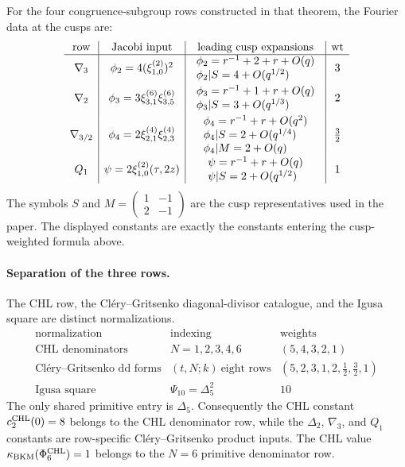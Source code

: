 For the four congruence-subgroup rows constructed in that theorem, the
Fourier data at the cusps are:
\[
\begin{array}{c|c|c|c}
\text{row} & \text{Jacobi input} & \text{leading cusp expansions}
& \operatorname{wt}\\
\hline
\nabla_3 &
\phi_2=4(\xi_{1,0}^{(2)})^2 &
\begin{array}{l}
\phi_2=r^{-1}+2+r+O(q)\\
\phi_2|S=4+O(q^{1/2})
\end{array}
& 3\\[2ex]
\nabla_2 &
\phi_3=3\xi_{3,1}^{(6)}\xi_{3,5}^{(6)} &
\begin{array}{l}
\phi_3=r^{-1}+1+r+O(q)\\
\phi_3|S=3+O(q^{1/3})
\end{array}
& 2\\[2ex]
\nabla_{3/2} &
\phi_4=2\xi_{2,1}^{(4)}\xi_{2,3}^{(4)} &
\begin{array}{l}
\phi_4=r^{-1}+r+O(q^2)\\
\phi_4|S=2+O(q^{1/4})\\
\phi_4|M=2+O(q)
\end{array}
& \frac32\\[3ex]
Q_1 &
\psi=2\xi_{1,0}^{(2)}(\tau,2z) &
\begin{array}{l}
\psi=r^{-1}+r+O(q)\\
\psi|S=2+O(q^{1/2})
\end{array}
& 1
\end{array}
\]
The symbols \(S\) and \(M=\left(\begin{smallmatrix}1&-1\\2&-1\end{smallmatrix}\right)\)
are the cusp representatives used in the paper.  The displayed constants
are exactly the constants entering the cusp-weighted formula above.

\paragraph{Separation of the three rows.}
The CHL row, the Cl\'ery--Gritsenko diagonal-divisor catalogue, and the
Igusa square are distinct normalizations.
\[
\begin{array}{c|c|c}
\text{normalization} & \text{indexing} & \text{weights}\\
\hline
\text{CHL denominators} & N=1,2,3,4,6 & (5,4,3,2,1)\\
\text{Cl\'ery--Gritsenko dd forms} & (t,N;k)\ \text{eight rows}
& (5,2,3,1,2,\frac12,\frac32,1)\\
\text{Igusa square} & \Psi_{10}=\Delta_5^2 & 10
\end{array}
\]
The only shared primitive entry is \(\Delta_5\).  Consequently the CHL
constant \(c_2^{\mathrm{CHL}}(0)=8\) belongs to the CHL denominator row, while
the \(\Delta_2\), \(\nabla_3\), and \(Q_1\) constants are
row-specific Cl\'ery--Gritsenko product inputs.  The CHL value
\(\kappa_{\mathrm{BKM}}(\Phi_6^{\mathrm{CHL}})=1\) belongs to the \(N=6\) primitive
denominator row.

